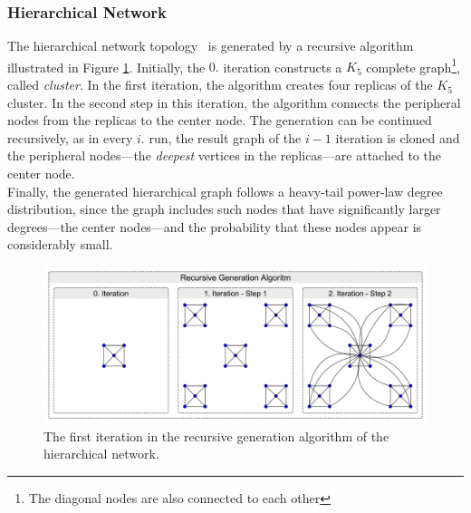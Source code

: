 \subsubsection{Hierarchical Network}

The hierarchical network topology~\cite{hierarchical} is generated by a recursive algorithm illustrated in Figure \ref{fig:hierarchical_generation}. Initially, the $0.$ iteration constructs a $K_5$ complete graph\footnote{The diagonal nodes are also connected to each other}, called \textit{cluster}. In the first iteration, the algorithm creates four replicas of the $K_5$ cluster. In the second step in this iteration, the algorithm connects the peripheral nodes from the replicas to the center node. The generation can be continued recursively, as in every $i.$ run, the result graph of the $i-1$ iteration is cloned and the peripheral nodes---the \textit{deepest} vertices in the replicas---are attached to the center node.\\
Finally, the generated hierarchical graph follows a heavy-tail power-law degree distribution, since the graph includes such nodes that have significantly larger degrees---the center nodes---and the probability that these nodes appear is considerably small.

\begin{figure}[!ht]
	\centering
	\includegraphics[width=140mm, keepaspectratio]{figures/hierarchical_generation.pdf}
	\caption{The first iteration in the recursive generation algorithm of the hierarchical network.}
	\label{fig:hierarchical_generation}
\end{figure}
